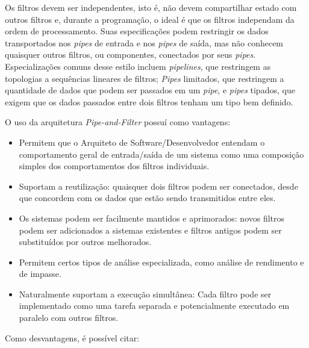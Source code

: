 \documentclass[portugues]{ic-tese}
\begin{document}
Os filtros devem ser independentes, isto é, não devem compartilhar estado com outros filtros e, durante a programação, o ideal é que os filtros independam da ordem de processamento. Suas especificações podem restringir os dados transportados nos \textit{pipes} de entrada e nos \textit{pipes} de saída, mas não conhecem quaisquer outros filtros, ou componentes, conectados por seus \textit{pipes}. Especializações comuns desse estilo incluem \textit{pipelines}, que restringem as topologias a sequências lineares de filtros; \textit{Pipes} limitados, que restringem a quantidade de dados que podem ser passados em um \textit{pipe}, e \textit{pipes} tipados, que exigem que os dados passados entre dois filtros tenham um tipo bem definido.

O uso da arquitetura \textit{Pipe-and-Filter} possuí como vantagens:

\begin{itemize}
\item Permitem que o Arquiteto de Software/Desenvolvedor entendam o comportamento geral de entrada/saída de um sistema como uma composição simples dos comportamentos dos filtros individuais.
\item Suportam a reutilização: quaisquer dois filtros podem ser conectados, desde que concordem com os dados que estão sendo transmitidos entre eles. 
\item Os sistemas podem ser facilmente mantidos e aprimorados: novos filtros podem ser adicionados a sistemas existentes e filtros antigos podem ser substituídos por outros melhorados.
\item Permitem certos tipos de análise especializada, como análise de rendimento e de impasse.
\item Naturalmente suportam a execução simultânea: Cada filtro pode ser implementado como uma tarefa separada e potencialmente executado em paralelo com outros filtros.
\end{itemize}

Como desvantagens, é possível citar:
\end{document}
